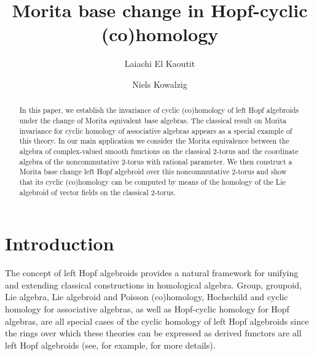 \documentclass[reqno, a4paper, 10pt]{amsart}
\numberwithin{equation}{section}
\theoremstyle{plain}
\theoremstyle{definition}
\theoremstyle{remark}
\begin{document}
\allowdisplaybreaks

\title{Morita base change in Hopf-cyclic (co)homology} 

\author{Laiachi El Kaoutit}
\author{Niels Kowalzig} 

\address{L.E.K.: 
Universidad de Granada, Departamento de \'Algebra, Facultad de Educaci\'on y Humanidades de Ceuta,
El Greco ${\rm N}^{\rm \underline{o}}$~10, 51002 Ceuta, Espa\~na}


\address{N.K.: 
Universidad de Granada, Departamento de \'Algebra, Facultad de Ciencias, 18071 Granada, Espa\~na}


\begin{abstract}
In this paper, we establish the invariance of cyclic (co)homology of left Hopf algebroids under the change of Morita equivalent base algebras. 
The classical 
result on Morita invariance for cyclic homology of associative algebras 
appears as a special example of this theory. 
 In our main application we consider the Morita equivalence between the algebra of complex-valued smooth functions on the classical $2$-torus and the  coordinate algebra of the noncommutative $2$-torus {with rational parameter}. We then construct a Morita base change left Hopf algebroid over {this} noncommutative $2$-torus and  show that 
its cyclic (co)homology  can be computed by means of the homology of the Lie 
algebroid of vector fields on the classical $2$-torus.
\end{abstract}

\maketitle

\section{Introduction}

The concept of left Hopf algebroids provides a natural
framework for unifying and extending classical constructions in homological
algebra. Group, groupoid, Lie algebra, Lie algebroid and Poisson (co)homology, Hochschild and cyclic homology for associative algebras, as well as Hopf-cyclic homology for Hopf algebras, are all special cases of the cyclic homology of left Hopf algebroids 
since the rings over which these theories can be expressed as derived functors are all left Hopf algebroids 
(see, for example, \cite{BoeSte:CCOBAAVC, ConMos:HACCATTIT, Cra:CCOHA, Kow:HAATCT, KowKra:CSIACT, KowPos:TCTOHA} for more details).
\end{document}
